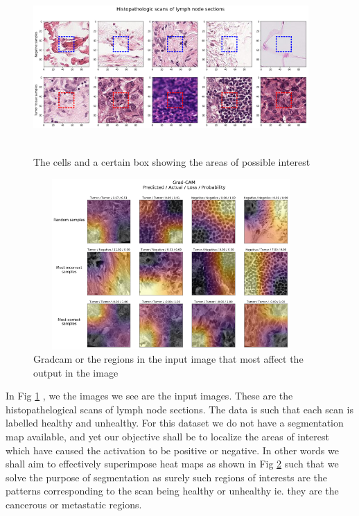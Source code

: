 \documentclass[19pt]{article}
\begin{document}
\begin{center}
    \begin{figure}[!h!t!b]
        \centerline{\includegraphics[width=105mm,height=65mm]{images/metastases.png}}
        \caption{The cells and a certain box showing the areas of possible interest}
        \label{fig:2}
    \end{figure}
\end{center}

\begin{center}
    \begin{figure}[!h!t!b]
        \centerline{\includegraphics[width=105mm,height=65mm]{images/gradcam.png}}
        \caption{Gradcam or the regions in the input image that most affect the output in the image}
        \label{fig:3}
    \end{figure}
\end{center}

In Fig \ref{fig:2} , we the images we see are the input images. These are the histopathelogical scans of lymph node sections. The data is such that each scan is labelled healthy and unhealthy. For this dataset we do not have a segmentation map available, and yet our objective shall be to localize the areas of interest which have caused the activation to be positive or negative. In other words we shall aim to effectively superimpose heat maps as shown in Fig \ref{fig:3} such that we solve the purpose of segmentation as surely such regions of interests are the patterns corresponding to the scan being healthy or unhealthy ie. they are the cancerous or metastatic regions. 
\end{document}
